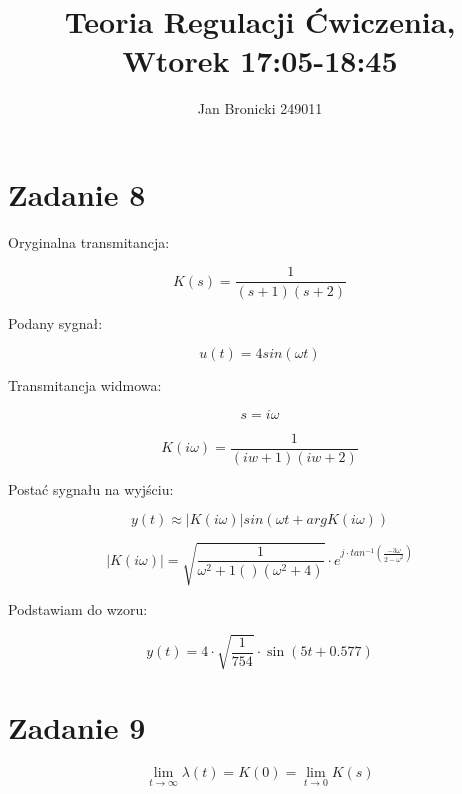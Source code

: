 \documentclass{article}
\title{Teoria Regulacji Ćwiczenia, Wtorek 17:05-18:45}
\author{Jan Bronicki 249011 }
\date{}
\begin{document}
\maketitle

\section*{Zadanie 8}

Oryginalna transmitancja:

$$ K(s) = \frac{1}{\left(s + 1\right) \left(s + 2\right)} $$

Podany sygnał:

$$ u(t) = 4sin(\omega t) $$

Transmitancja widmowa:

$$ s = i\omega $$

$$K(i\omega) = \frac{1}{\left(i w + 1\right) \left(i w + 2\right)}$$

Postać sygnału na wyjściu:

$$y(t)\approx\left|K(i\omega)\right|sin\left(\omega t + argK(i \omega)\right)$$



$$ \left|K(i\omega)\right| = \sqrt{\frac{1}{\omega^{2}+1()(\omega^{2}+4)}}\cdot e^{j\cdot 
tan^{-1}\left(\frac{-3\omega}{2-\omega^{2}}\right)} $$

Podstawiam do wzoru:

$$y(t)=4\cdot \sqrt{\frac{1}{754}}\cdot \sin\left(5t+0.577\right)$$



\newpage

\section*{Zadanie 9}

$$ \lim\limits_{t \to \infty} \lambda(t) = K(0) = \lim\limits_{t \to 0} K(s)  $$
\end{document}
